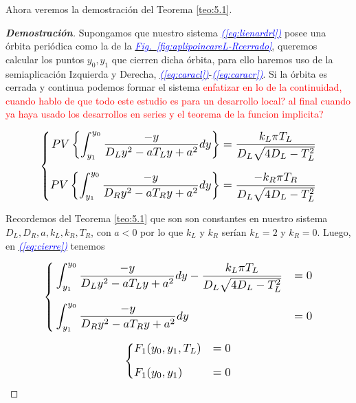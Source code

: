 \documentclass[12pt,a4paper]{report} %
\newcommand{\fref}[1]{\hyperref[#1]{\textcolor{blue}{\textit{Fig.~\ref*{#1}}}}}
\newcommand{\eref}[1]{\hyperref[#1]{\textcolor{blue}{\textit{(\ref*{#1})}}}}
\begin{document}
	\vspace{0.5cm}\noindent Ahora veremos la demostración del Teorema \ref{teo:5.1}.
	\begin{proof}[\textbf{Demostración}]
		\label{dem5.1}
	Supongamos que nuestro sistema \eref{eq:lienardrl} posee una órbita periódica como la de la \fref{fig:aplipoincareL-Rcerrado}, queremos calcular los puntos $y_0, y_1$ que cierren dicha órbita, para ello haremos uso de la semiaplicación Izquierda y Derecha, \eref{eq:caracl}-\eref{eq:caracr}. Si la órbita es cerrada  y continua podemos formar el sistema \textcolor{red}{enfatizar en lo de la continuidad, cuando hablo de que todo este estudio es para un desarrollo local? al final cuando ya haya usado los desarrollos en series y el teorema de la funcion implicita?}
	
	\begin{equation}
		\label{eq:cierre}
		\scalebox{1.2}{$\displaystyle
			\left\{
			\begin{aligned}
				PV\left\{\int_{y_1}^{y_0}\frac{-y}{D_Ly^2-aT_Ly+a^2}dy\right\}&=\frac{k_L\pi T_L}{D_L\sqrt{4D_L-T_L^2}}
				\\[2mm]
				PV\left\{\int_{y_1}^{y_0}\frac{-y}{D_Ry^2-aT_Ry+a^2}dy\right\}&=\frac{-k_R\pi T_R}{D_L\sqrt{4D_L-T_L^2}}
			\end{aligned}
			\right. 
			$}
	\end{equation}\smallskip
	
	\vspace{0.5cm}\noindent Recordemos del Teorema \ref{teo:5.1} que son son constantes en nuestro sistema $D_L,D_R,a,k_L,k_R,T_R$, con $a<0$ por lo que $k_L$ y $k_R$ serían $k_L=2$ y $k_R=0$. Luego, en \eref{eq:cierre} tenemos
	
	\begin{equation}
		\label{eq:cierre2}
		\scalebox{1.2}{$\displaystyle
			\left\{
			\begin{aligned}
				&\int_{y_1}^{y_0}\frac{-y}{D_Ly^2-aT_Ly+a^2}dy-\frac{k_L\pi T_L}{D_L\sqrt{4D_L-T_L^2}}&=0
				\\[2mm]
				&\int_{y_1}^{y_0}\frac{-y}{D_Ry^2-aT_Ry+a^2}dy&=0
			\end{aligned}
			\right. 
			$}
	\end{equation}\smallskip
	
	\begin{equation}
		\label{eq:cierre3}
		\scalebox{1.2}{$\displaystyle
			\left\{
			\begin{aligned}
				&F_1(y_0,y_1,T_L)&=0
				\\[2mm]
				&F_1(y_0,y_1)&=0
			\end{aligned}
			\right. 
			$}
	\end{equation}\smallskip
	

\end{proof}
\end{document}
